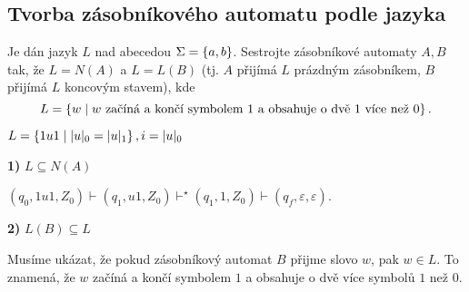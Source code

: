 \subsection{Tvorba zásobníkového automatu podle jazyka}
Je dán jazyk $L$ nad abecedou $\Sigma = \left\lbrace a,b \right\rbrace$. Sestrojte zásobníkové automaty $A,B$ tak, že $L = N(A)$ a $L = L(B)$ 
(tj. $A$ přijímá $L$ prázdným zásobníkem, $B$ přijímá $L$ koncovým stavem), kde
\[L = \left\lbrace w \mid w \text{ začíná a končí symbolem } 1 \text{ a obsahuje o dvě } 1 \text{ více než } 0 \right\rbrace\text{.}\]

$L = \left\lbrace 1u1 \mid |u|_0 = |u|_1 \right\rbrace, i = |u|_0$


\textbf{1)} $L \subseteq N(A)$

$(q_0, 1u1, Z_0) \vdash (q_1, u1, Z_0) \vdash^\star (q_1, 1, Z_0) \vdash (q_f, \varepsilon, \varepsilon)$.

\textbf{2)} $L(B) \subseteq L$

Musíme ukázat, že pokud zásobníkový automat $B$ přijme slovo $w$, pak $w \in L$. To znamená, že $w$ začíná a končí 
symbolem $1$ a obsahuje o dvě více symbolů $1$ než $0$.

